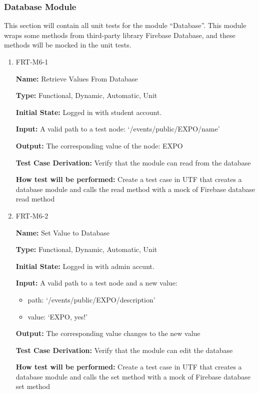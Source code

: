 \documentclass[12pt, titlepage]{article}
\begin{document}
\subsubsection{Database Module}

This section will contain all unit tests for the module ``Database''.  This module wraps some methods from third-party library Firebase Database, and these methods will be mocked in the unit tests.

\begin{enumerate}
\item{FRT-M6-1}

\textbf{Name:} Retrieve Values From Database

\textbf{Type:} Functional, Dynamic, Automatic, Unit
					
\textbf{Initial State:} Logged in with student account.
					
\textbf{Input:} A valid path to a test node: `/events/public/EXPO/name'
					
\textbf{Output:} The corresponding value of the node: EXPO

\textbf{Test Case Derivation:} Verify that the module can read from the database

\textbf{How test will be performed:} Create a test case in UTF that creates a database module and calls the read method with a mock of Firebase database read method

\item{FRT-M6-2}

\textbf{Name:} Set Value to Database

\textbf{Type:} Functional, Dynamic, Automatic, Unit
					
\textbf{Initial State:} Logged in with admin accunt.
					
\textbf{Input:} A valid path to a test node and a new value: 
\begin{itemize}
\item path: `/events/public/EXPO/description'
\item value: `EXPO, yes!'
\end{itemize}

\textbf{Output:} The corresponding value changes to the new value

\textbf{Test Case Derivation:} Verify that the module can edit the database

\textbf{How test will be performed:} Create a test case in UTF that creates a database module and calls the set method with a mock of Firebase database set method


\end{enumerate}
\end{document}
